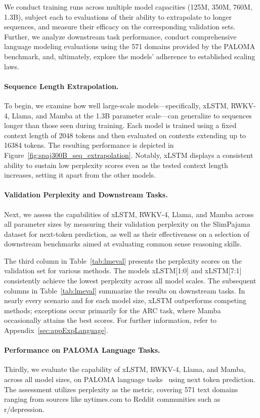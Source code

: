 We conduct training runs across multiple model capacities (125M, 350M, 760M, 1.3B), subject each to evaluations of their ability to extrapolate to longer sequences, and measure their efficacy on the corresponding validation sets. Further, we analyze downstream task performance, conduct comprehensive language modeling evaluations using the 571 domains provided by the PALOMA benchmark, and, ultimately, explore the models' adherence to established scaling laws.

\paragraph{Sequence Length Extrapolation.}
\label{sec:spaj300B_ctx_extrapolation}
To begin, we examine how well large-scale models—specifically, xLSTM, RWKV-4, Llama, and Mamba at the 1.3B parameter scale—can generalize to sequences longer than those seen during training. Each model is trained using a fixed context length of 2048 tokens and then evaluated on contexts extending up to 16384 tokens. The resulting performance is depicted in Figure~\ref{fig:spaj300B_seq_extrapolation}. Notably, xLSTM displays a consistent ability to sustain low perplexity scores even as the tested context length increases, setting it apart from the other models.

\paragraph{Validation Perplexity and Downstream Tasks.}
\label{sec:spaj_downstream_eval}
Next, we assess the capabilities of xLSTM, RWKV-4, Llama, and Mamba across all parameter sizes by measuring their validation perplexity on the SlimPajama dataset for next-token prediction, as well as their effectiveness on a selection of downstream benchmarks aimed at evaluating common sense reasoning skills.

The third column in Table~\ref{tab:lmeval} presents the perplexity scores on the validation set for various methods. The models xLSTM[1:0] and xLSTM[7:1] consistently achieve the lowest perplexity across all model scales. The subsequent columns in Table~\ref{tab:lmeval} summarize the results on downstream tasks. In nearly every scenario and for each model size, xLSTM outperforms competing methods; exceptions occur primarily for the ARC task, where Mamba occasionally attains the best scores. For further information, refer to Appendix~\ref{sec:appExpLanguage}.

\paragraph{Performance on PALOMA Language Tasks.} Thirdly, we evaluate the capability of xLSTM, RWKV-4, Llama, and Mamba, across all model sizes, on PALOMA language tasks~\citep{Magnusson:23arxivshort} using next token prediction. The assessment utilizes perplexity as the metric, covering 571 text domains ranging from sources like nytimes.com to Reddit communities such as r/depression. 

